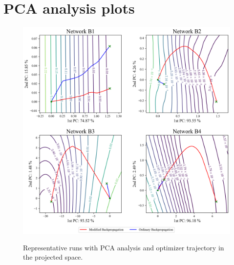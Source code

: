 \documentclass{article}
\theoremstyle{plain}
\theoremstyle{definition}
\theoremstyle{remark}
\begin{document}
\section{PCA analysis plots}
\label{app:pca}
\begin{figure}[htbp]
    \centering
    \includegraphics[width=\textwidth]{./resources/pca_all.png}
    \label{fig:big-pca}
    \caption{Representative runs with PCA analysis and optimizer trajectory in the projected space.}
\end{figure}
\end{document}
